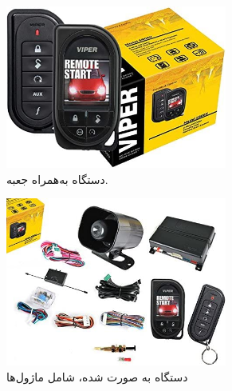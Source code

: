 \documentclass[a4paper,12pt]{report}
\begin{document}
	\begin{figure}[!h]
		\centering
		\footnotesize
		\begin{subfigure}[t]{0.3\linewidth}
			\centering
			\includegraphics[width=0.8\textwidth]{images/viper_5906V_1.jpg}
			\caption{
				دستگاه
				به‌همراه جعبه.
			}
			\label{subfig1:fig1:sec3:chap1}
		\end{subfigure}
		\hspace*{1cm}
		\begin{subfigure}[t]{0.3\linewidth}
			\centering
			\includegraphics[width=0.8\textwidth]{images/viper_5906V_2.jpg}
			\caption{
				دستگاه 	به صورت
				شده، شامل ماژول‌ها
			}
			\label{subfig2:fig1:sec3:chap1}
		\end{subfigure}
		\\\vspace*{5mm}%
		\begin{subfigure}[t]{0.3\linewidth}
			\centering

\end{subfigure}
\end{figure}
\end{document}
